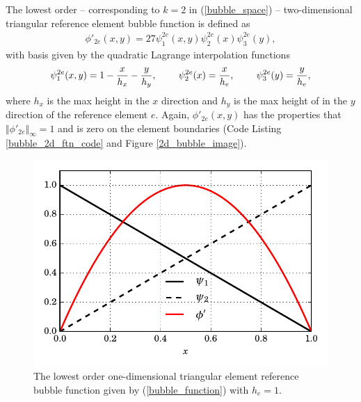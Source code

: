 The lowest order -- corresponding to $k = 2$ in (\ref{bubble_space}) -- two-dimensional triangular reference element bubble function is defined as
\begin{align}
  \label{2d_bubble_function}
  \phi'_{2e}(x,y) = 27 \psi_1^{2e}(x,y) \psi_2^{2e}(x) \psi_3^{2e}(y),
\end{align}
with basis given by the quadratic Lagrange interpolation functions
\begin{align*}
  \psi_1^{2e}(x,y) = 1 - \frac{x}{h_x} - \frac{y}{h_y}, \hspace{8mm} \psi_2^{2e}(x) = \frac{x}{h_e}, \hspace{8mm} \psi_3^{2e}(y) = \frac{y}{h_e},
\end{align*}
where $h_x$ is the max height in the $x$ direction and $h_y$ is the max height of in the $y$ direction of the reference element $e$.  Again, $\phi'_{2e}(x,y)$ has the properties that $\Vert \phi'_{2e} \Vert_{\infty} = 1$ and is zero on the element boundaries (Code Listing \ref{bubble_2d_ftn_code} and Figure \ref{2d_bubble_image}).


\begin{figure}
  \centering
    \includegraphics[width=\linewidth]{images/bubbles/bubble_new.pdf}
  \caption[One-dimensional bubble function]{The lowest order one-dimensional triangular element reference bubble function given by (\ref{bubble_function}) with $h_e = 1$.}
  \label{1d_bubble_image}
\end{figure}

